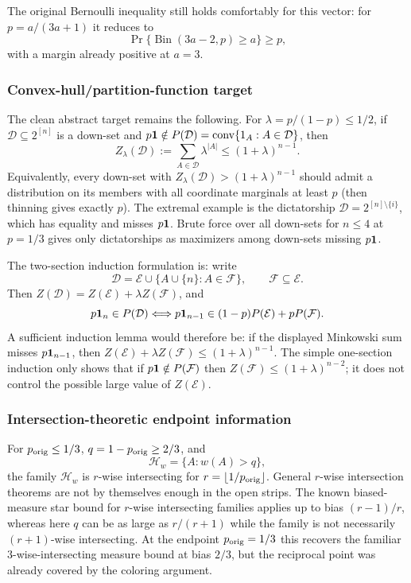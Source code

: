 \documentclass[12pt]{article}
\begin{document}
The original Bernoulli inequality still holds comfortably for this vector:
for \(p=a/(3a+1)\) it reduces to
\[
   \Pr\{\operatorname{Bin}(3a-2,p)\ge a\}\ge p,
\]
with a margin already positive at \(a=3\).

\subsubsection*{Convex-hull/partition-function target}

The clean abstract target remains the following.  For
\(\lambda=p/(1-p)\le1/2\), if \(\mathcal D\subseteq2^{[n]}\) is a down-set and
\(p{\bf1}\notin P(\mathcal D)=\operatorname{conv}\{1_A:A\in\mathcal D\}\),
then
\[
       Z_\lambda(\mathcal D):=\sum_{A\in\mathcal D}\lambda^{|A|}
       \le (1+\lambda)^{n-1}.
\]
Equivalently, every down-set with \(Z_\lambda(\mathcal D)>(1+\lambda)^{n-1}\)
should admit a distribution on its members with all coordinate marginals at
least \(p\) (then thinning gives exactly \(p\)).  The extremal example is the
dictatorship \(\mathcal D=2^{[n]\setminus\{i\}}\), which has equality and
misses \(p{\bf1}\).  Brute force over all down-sets for \(n\le4\) at
\(p=1/3\) gives only dictatorships as maximizers among down-sets missing
\(p{\bf1}\).

The two-section induction formulation is: write
\[
 \mathcal D=\mathcal E\cup\{A\cup\{n\}:A\in\mathcal F\},\qquad
 \mathcal F\subseteq\mathcal E.
\]
Then \(Z(\mathcal D)=Z(\mathcal E)+\lambda Z(\mathcal F)\), and
\[
 p{\bf1}_{n}\in P(\mathcal D)
 \Longleftrightarrow
 p{\bf1}_{n-1}\in (1-p)P(\mathcal E)+pP(\mathcal F).
\]
A sufficient induction lemma would therefore be:
if the displayed Minkowski sum misses \(p{\bf1}_{n-1}\), then
\(Z(\mathcal E)+\lambda Z(\mathcal F)\le(1+\lambda)^{n-1}\).  The simple
one-section induction only shows that if \(p{\bf1}\notin P(\mathcal F)\) then
\(Z(\mathcal F)\le(1+\lambda)^{n-2}\); it does not control the possible
large value of \(Z(\mathcal E)\).

\subsubsection*{Intersection-theoretic endpoint information}

For \(p_{\rm orig}\le1/3\), \(q=1-p_{\rm orig}\ge2/3\), and
\[
  \mathcal H_w=\{A:w(A)>q\},
\]
the family \(\mathcal H_w\) is \(r\)-wise intersecting for
\(r=\lfloor1/p_{\rm orig}\rfloor\).  General \(r\)-wise intersection theorems
are not by themselves enough in the open strips.  The known biased-measure
star bound for \(r\)-wise intersecting families applies up to bias
\((r-1)/r\), whereas here \(q\) can be as large as \(r/(r+1)\) while the
family is not necessarily \((r+1)\)-wise intersecting.  At the endpoint
\(p_{\rm orig}=1/3\) this recovers the familiar \(3\)-wise-intersecting
measure bound at bias \(2/3\), but the reciprocal point was already covered by
the coloring argument.
\end{document}

